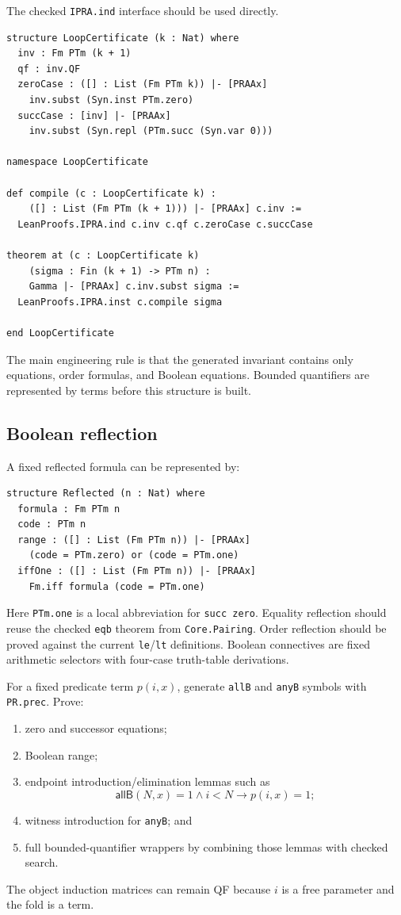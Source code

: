 The checked \texttt{IPRA.ind} interface should be used directly.

\begin{lstlisting}
structure LoopCertificate (k : Nat) where
  inv : Fm PTm (k + 1)
  qf : inv.QF
  zeroCase : ([] : List (Fm PTm k)) |- [PRAAx]
    inv.subst (Syn.inst PTm.zero)
  succCase : [inv] |- [PRAAx]
    inv.subst (Syn.repl (PTm.succ (Syn.var 0)))

namespace LoopCertificate

def compile (c : LoopCertificate k) :
    ([] : List (Fm PTm (k + 1))) |- [PRAAx] c.inv :=
  LeanProofs.IPRA.ind c.inv c.qf c.zeroCase c.succCase

theorem at (c : LoopCertificate k)
    (sigma : Fin (k + 1) -> PTm n) :
    Gamma |- [PRAAx] c.inv.subst sigma :=
  LeanProofs.IPRA.inst c.compile sigma

end LoopCertificate
\end{lstlisting}
The main engineering rule is that the generated invariant contains only equations, order formulas, and Boolean equations.  Bounded quantifiers are represented by terms before this structure is built.

\subsection{Boolean reflection}

A fixed reflected formula can be represented by:

\begin{lstlisting}
structure Reflected (n : Nat) where
  formula : Fm PTm n
  code : PTm n
  range : ([] : List (Fm PTm n)) |- [PRAAx]
    (code = PTm.zero) or (code = PTm.one)
  iffOne : ([] : List (Fm PTm n)) |- [PRAAx]
    Fm.iff formula (code = PTm.one)
\end{lstlisting}
Here \texttt{PTm.one} is a local abbreviation for \texttt{succ zero}.  Equality reflection should reuse the checked \texttt{eqb} theorem from \texttt{Core.Pairing}.  Order reflection should be proved against the current \texttt{le}/\texttt{lt} definitions.  Boolean connectives are fixed arithmetic selectors with four-case truth-table derivations.

For a fixed predicate term \(p(i,x)\), generate \texttt{allB} and \texttt{anyB} symbols with \texttt{PR.prec}.  Prove:
\begin{enumerate}[label=(\arabic*)]
  \item zero and successor equations;
  \item Boolean range;
  \item endpoint introduction/elimination lemmas such as
  \[
    \mathsf{allB}(N,x)=1\wedge i<N\to p(i,x)=1;
  \]
  \item witness introduction for \texttt{anyB}; and
  \item full bounded-quantifier wrappers by combining those lemmas with checked search.
\end{enumerate}
The object induction matrices can remain QF because \(i\) is a free parameter and the fold is a term.

